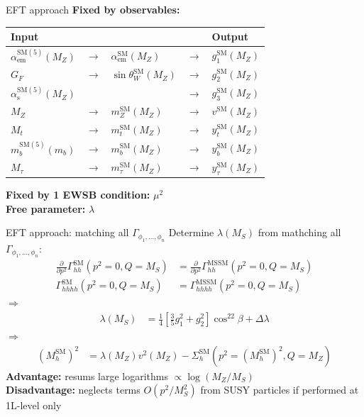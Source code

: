 \documentclass[hyperref={pdfpagelabels=false},ngerman]{beamer}
\renewcommand{\emph}{\textbf}
\newcommand{\SM}{\ensuremath{\text{SM}}}
\begin{document}
\begin{frame}{EFT approach}
  \emph{Fixed by observables:}
  \begin{table}
    \centering
    \begin{tabular}{lllll}
      Input & & & & Output \\
      \midrule
      $\alpha_\text{em}^{\SM(5)}(M_Z)$ & $\rightarrow$ & $\alpha_\text{em}^\SM(M_Z)$ & $\rightarrow$ & $g_1^\SM(M_Z)$ \\
      $G_F$ & $\rightarrow$ & $\sin\theta_W^\SM(M_Z)$ & $\rightarrow$ & $g_2^\SM(M_Z)$ \\
      $\alpha_\text{s}^{\SM(5)}(M_Z)$ & & & $\rightarrow$ & $g_3^\SM(M_Z)$ \\
      $M_Z$ & $\rightarrow$ & $m_Z^\SM(M_Z)$ & $\rightarrow$ & $v^\SM(M_Z)$ \\
      $M_t$ & $\rightarrow$ & $m_t^\SM(M_Z)$ & $\rightarrow$ & $y_t^\SM(M_Z)$ \\
      $m_b^{\SM(5)}(m_b)$ & $\rightarrow$ & $m_b^\SM(M_Z)$ & $\rightarrow$ & $y_b^\SM(M_Z)$ \\
      $M_\tau$ & $\rightarrow$ & $m_\tau^\SM(M_Z)$ & $\rightarrow$ & $y_\tau^\SM(M_Z)$ \\
    \end{tabular}
  \end{table}
  \emph{Fixed by 1 EWSB condition:} $\mu^2$ \\[1em]
  \emph{Free parameter:} $\lambda$
\end{frame}

\begin{frame}{EFT approach: matching all $\Gamma_{\phi_1,\ldots,\phi_n}$}
  Determine $\lambda(M_S)$ from mathching all $\Gamma_{\phi_1,\ldots,\phi_n}$:
  \begin{align*}
    \frac{\partial}{\partial p^2}\Gamma_{hh}^{\SM}(p^2 = 0, Q = M_S) &= \frac{\partial}{\partial p^2}\Gamma_{hh}^\text{MSSM}(p^2 = 0, Q = M_S) \\
    \Gamma_{hhhh}^{\SM}(p^2 = 0, Q = M_S) &= \Gamma_{hhhh}^\text{MSSM}(p^2 = 0, Q = M_S)
  \end{align*}
  $\Rightarrow$
  \begin{align*}
    \lambda (M_S) &= \frac{1}{4}\left[\frac{3}{5} g_1^{2} + g_2^2\right] \cos^22\beta
    + \Delta \lambda
  \end{align*}
  $\Rightarrow$
  \begin{align*}
    (M_h^\SM)^2 &= \lambda(M_Z) v^2(M_Z) - \Sigma^\SM_h(p^2 = (M_h^\SM)^2,Q =
    M_Z)
  \end{align*}
  \emph{Advantage:} resums large logarithms $\propto\log(M_Z/M_S)$\\
  \emph{Disadvantage:} neglects terms $O(p^2/M_S^2)$ from SUSY
  particles if performed at 1L-level only
\end{frame}
\end{document}
